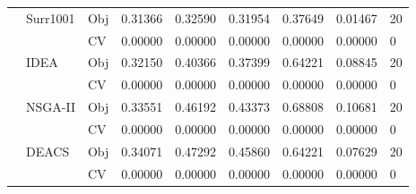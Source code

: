 \begin{table*}[!htb]
\begin{tabular}{lllllllll}
		& Surr1001                           & Obj                                & 0.31366                            & 0.32590                            & 0.31954                              & 0.37649                             & 0.01467                           & 20               \\
		&                                    & CV                                 & 0.00000                            & 0.00000                            & 0.00000                              & 0.00000                             & 0.00000                           & 0                \\
		& IDEA                               & Obj                                & 0.32150                            & 0.40366                            & 0.37399                              & 0.64221                             & 0.08845                           & 20               \\
		&                                    & CV                                 & 0.00000                            & 0.00000                            & 0.00000                              & 0.00000                             & 0.00000                           & 0                \\
		& NSGA-II                            & Obj                                & 0.33551                            & 0.46192                            & 0.43373                              & 0.68808                             & 0.10681                           & 20               \\
		&                                    & CV                                 & 0.00000                            & 0.00000                            & 0.00000                              & 0.00000                             & 0.00000                           & 0                \\
		& DEACS                              & Obj                                & 0.34071                            & 0.47292                            & 0.45860                              & 0.64221                             & 0.07629                           & 20               \\
		&                                    & CV                                 & 0.00000                            & 0.00000                            & 0.00000                              & 0.00000                             & 0.00000                           & 0                \\

\end{tabular}
\end{table*}
